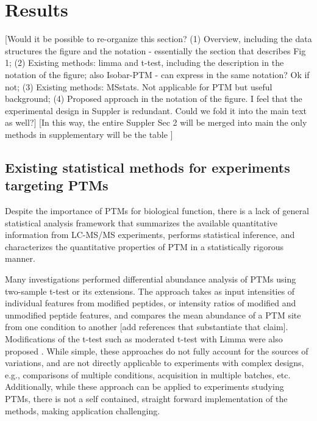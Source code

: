 \documentclass[mcp]{article}
\numberwithin{table}{section}
\def\todo#1{{\color{red}[#1]}}
\begin{document}
\section*{Results}

\todo{Would it be possible to re-organize this section? (1) Overview, including the data structures  the figure and the notation - essentially the section that describes Fig 1; (2) Existing methods: limma and t-test, including the description in the notation of the figure; also Isobar-PTM - can express in the same notation? Ok if not; (3) Existing methods: MSstats. Not applicable for PTM but useful background; (4) Proposed approach in the notation of the figure. I feel that the experimental design in Suppler is redundant. Could we fold it into the main text as well?} \todo{In this way, the entire Suppler Sec 2 will be merged into main \; the only methods in supplementary will be the table }


\subsection*{Existing statistical methods for experiments targeting PTMs}

Despite the importance of PTMs for biological function, there is a lack of general statistical analysis framework that summarizes the available quantitative information from LC-MS/MS experiments, performs statistical inference, and characterizes the quantitative properties of PTM in a statistically rigorous manner. 

Many investigations performed differential abundance analysis of PTMs using two-sample t-test or its extensions.  The approach takes as input intensities of individual features from modified peptides, or intensity ratios of modified and unmodified peptide features, and compares the mean abundance of a PTM site from one condition to another \todo{add references that substantiate that claim}. Modifications of the t-test such as moderated t-test with Limma were also proposed \cite{Zhu}. While simple, these approaches do not fully account for the sources of variations, and are not directly applicable to experiments with complex designs, e.g., comparisons of multiple conditions, acquisition in multiple batches, etc. Additionally, while these approach can be applied to experiments studying PTMs, there is not a self contained, straight forward implementation of the methods, making application challenging. 
\end{document}
